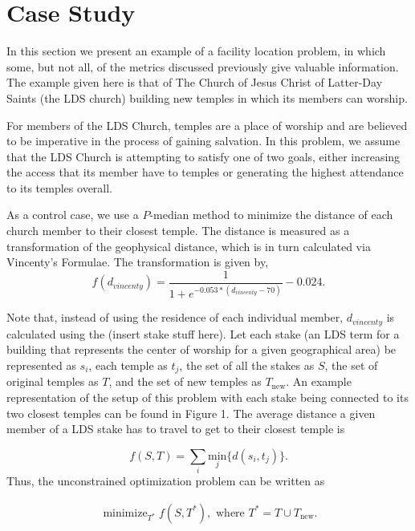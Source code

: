 \documentclass[twoside,twocolumn]{article}
\DeclareMathOperator*{\minimize}{minimize}
\begin{document}
\section{Case Study}

In this section we present an example of a facility location problem, in which some, but not all, of the metrics discussed previously give valuable information. 
The example given here is that of The Church of Jesus Christ of Latter-Day Saints (the LDS church) building new temples in which its members can worship.


For members of the LDS Church, temples are a place of worship and are believed to be imperative in the process of gaining salvation.
In this problem, we assume that the LDS Church is attempting to satisfy one of two goals, either increasing the access that its member have to temples or generating the highest attendance to its temples overall.

As a control case, we use a $P$-median method to minimize the distance of each church member to their closest temple.
The distance is measured as a transformation of the geophysical distance, which is in turn calculated via Vincenty's Formulae. %
The transformation is given by,
\begin{equation}
f(d_{vincenty}) = \frac{1}{1+e^{-0.053*(d_{vincenty} - 70)}} - 0.024.
\end{equation}

Note that, instead of using the residence of each individual member, $d_{vincenty}$ is calculated using the (insert stake stuff here).
Let each stake (an LDS term for a building that represents the center of worship for a given geographical area) be represented as $s_i$, each temple as $t_j$, the set of all the stakes as $S$, the set of original temples as $T$, and the set of new temples as $T_{\text{new}}$.
An example representation of the setup of this problem with each stake being connected to its two closest temples can be found in Figure 1.
The average distance a given member of a LDS stake has to travel to get to their closest temple is

\begin{equation}
	f(S,T) = \sum_i \underset{j}{\text{min}}\{d(s_i,t_j)\}.
\end{equation}
Thus, the unconstrained optimization problem can be written as

\begin{equation}
\begin{aligned}
	\minimize_{T^*} f(S,T^*), \text{ where } T^* = T \cup T_{\text{new}}.
\end{aligned}
\end{equation}
\end{document}
